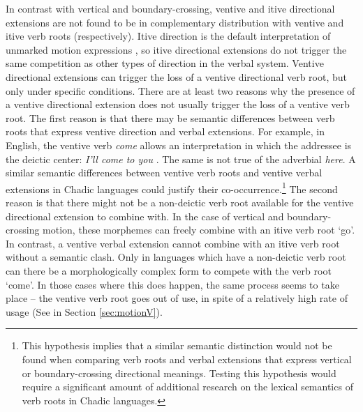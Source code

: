 In contrast with vertical and boundary-crossing, ventive and itive directional extensions are not found to be in complementary distribution with ventive and itive verb roots (respectively). Itive direction is the default interpretation of unmarked motion expressions \citep{wilkinsWhenGOMeans1995}, so itive directional extensions do not trigger the same competition as other types of direction in the verbal system. Ventive directional extensions can trigger the loss of a ventive directional verb root, but only under specific conditions. There are at least two reasons why the presence of a ventive directional extension does not usually trigger the loss of a ventive verb root. The first reason is that there may be semantic differences between verb roots that express ventive direction and verbal extensions. For example, in English, the ventive verb \textit{come} allows an interpretation in which the addressee is the deictic center: \textit{I'll come to you} \citep{goddardSemanticsComingGoing1997}. The same is not true of the adverbial \textit{here}. A similar semantic differences between ventive verb roots and ventive verbal extensions in Chadic languages could justify their co-occurrence.\footnote{This hypothesis implies that a similar semantic distinction would not be found when comparing verb roots and verbal extensions that express vertical or boundary-crossing directional meanings. Testing this hypothesis would require a significant amount of additional research on the lexical semantics of verb roots in Chadic languages.} The second reason is that there might not be a non-deictic verb root available for the ventive directional extension to combine with. In the case of vertical and boundary-crossing motion, these morphemes can freely combine with an itive verb root `go'. In contrast, a ventive verbal extension cannot combine with an itive verb root without a semantic clash. Only in languages which have a non-deictic verb root can there be a morphologically complex form to compete with the verb root `come'. In those cases where this does happen, the same process seems to take place -- the ventive verb root goes out of use, in spite of a relatively high rate of usage (See  in Section \ref{sec:motionV}).
